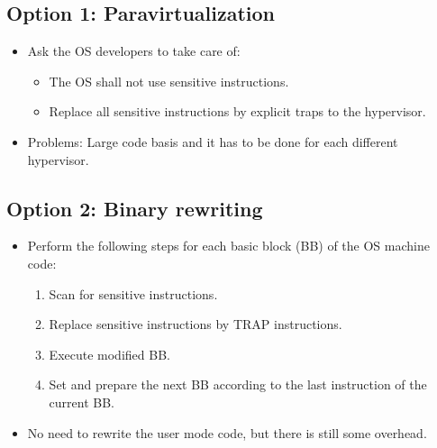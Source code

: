 \documentclass[a4paper, 11pt, accentcolor = tud3b]{tudreport}
\begin{document}
	        \subsection{Option 1: Paravirtualization}
		        \begin{itemize}
		        	\item Ask the OS developers to take care of:
			        	\begin{itemize}
			        		\item The OS shall not use sensitive instructions.
			        		\item Replace all sensitive instructions by explicit traps to the hypervisor.
			        	\end{itemize}
		        	\item Problems: Large code basis and it has to be done for each different hypervisor.
		        \end{itemize}
        
	        \subsection{Option 2: Binary rewriting}
		        \begin{itemize}
		        	\item Perform the following steps for each basic block (BB) of the OS machine code:
			        	\begin{enumerate}
			        		\item Scan for sensitive instructions.
			        		\item Replace sensitive instructions by TRAP instructions.
			        		\item Execute modified BB.
			        		\item Set and prepare the next BB according to the last instruction of the current BB.
			        	\end{enumerate}
		        	\item No need to rewrite the user mode code, but there is still some overhead.
		        \end{itemize}
	        
\end{document}
